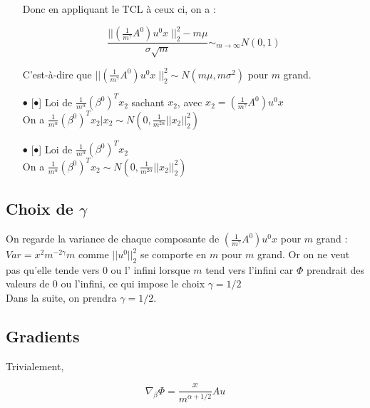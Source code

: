 \documentclass[a4paper, 11pt, french]{article}
\begin{document}
\begin{itemize}
		Donc en appliquant le TCL à ceux ci, on a :
		
		 \[
		 	\frac{|| \left(\frac{1}{m^{\gamma}} A^0 \right) u^0 x \; ||_2^2 - m \mu}{\sigma \sqrt{m}} \sim_{m \to \infty}  N(0, 1)
		 \]
		
		C'est-à-dire que $|| \left(\frac{1}{m^{\gamma}} A^0 \right) u^0 x \; ||_2^2 \sim 
		N(m \mu, m \sigma^2) $  pour $m$ grand. \\
		
		\newpage
		
		\item[$\bullet$][$\bullet$] Loi de $ \frac{1}{m^{\alpha}} (\beta^0)^T x_2 $ sachant $x_2$, avec 
		$x_2 = \left(\frac{1}{m^{\gamma}} A^0 \right) u^0 x$ \\
		
		On a 
		$ \frac{1}{m^{\alpha}} (\beta^0)^T x_2 | x_2 \sim N(0,  \frac{1}{m^{2\alpha}}||x_2||_2^2) $
		\\
		
		\item[$\bullet$][$\bullet$] Loi de $ \frac{1}{m^{\alpha}} (\beta^0)^T x_2 $ \\
		
		On a 
		$ \frac{1}{m^{\alpha}} (\beta^0)^T x_2 \sim N(0,  \frac{1}{m^{2\alpha}}||x_2||_2^2) $
		\\
		
	\end{itemize}

	\subsection{Choix de $\gamma$}
	
	On regarde la variance de chaque composante de 
	$ \left(\frac{1}{m^{\gamma}} A^0 \right) u^0 x $ pour $m$ grand : 
	$ Var = x^2 m^{-2\gamma} m $ comme $|| u^0 ||_2^2$ se comporte en $m$ pour $m$ grand. Or on ne veut pas qu'elle tende vers 0 ou l' infini lorsque $m$ tend vers l'infini car $\Phi$ prendrait des valeurs de 0 ou l'infini, ce qui impose le choix $\gamma = 1/2$ \\
	
	Dans la suite, on prendra $\gamma = 1/2$.

	\subsection{Gradients}
	
	Trivialement,
	
	\[\nabla_{\beta} \Phi = \frac{x}{m^{\alpha + 1/2}} A u\]
	
\end{document}
